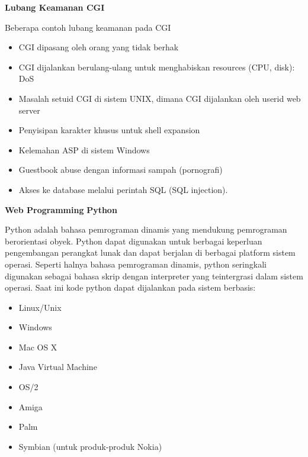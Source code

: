 \documentclass{wileySix}
\begin{document}
\par
\vspace{12pt}
\noindent 
\textbf{Lubang Keamanan CGI} \par
\noindent 
Beberapa contoh lubang keamanan pada CGI \par
\noindent 
\begin{itemize}
	\item CGI dipasang oleh orang yang tidak berhak \par
	\noindent 
	\item CGI dijalankan berulang-ulang untuk menghabiskan resources (CPU, disk): DoS \par
	\noindent 
	\item Masalah setuid CGI di sistem UNIX, dimana CGI dijalankan oleh userid web server \par
	\noindent 
	\item Penyisipan karakter khusus untuk shell expansion \par
	\noindent 
	\item Kelemahan ASP di sistem Windows \par
	\noindent 
	\item Guestbook abuse dengan informasi sampah (pornografi) \par
	\noindent 
	\item Akses ke database melalui perintah SQL (SQL injection).\end{itemize}
\par
\vspace{12pt}
\noindent 
\textbf{Web Programming }\textbf{Python} \par
Python adalah bahasa pemrograman dinamis yang mendukung pemrograman berorientasi obyek. Python dapat digunakan untuk berbagai keperluan pengembangan perangkat lunak dan dapat berjalan di berbagai platform sistem operasi. Seperti halnya bahasa pemrograman dinamis, python seringkali digunakan sebagai bahasa skrip dengan interpreter yang teintergrasi dalam sistem operasi. Saat ini kode python dapat dijalankan pada sistem berbasis: \par
\noindent 
\begin{itemize}
	\item Linux/Unix \par
	\noindent 
	\item Windows \par
	\noindent 
	\item Mac OS X \par
	\noindent 
	\item Java Virtual Machine \par
	\noindent 
	\item OS/2 \par
	\noindent 
	\item Amiga \par
	\noindent 
	\item Palm \par
	\noindent 
	\item Symbian (untuk produk-produk Nokia)\end{itemize}
\end{document}
